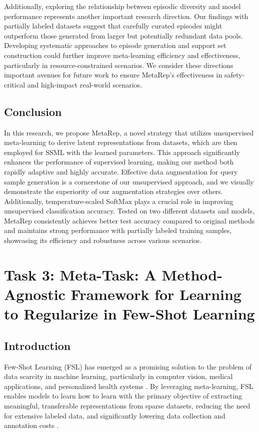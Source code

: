 Additionally, exploring the relationship between episodic diversity and model performance represents another important research direction. Our findings with partially labeled datasets suggest that carefully curated episodes might outperform those generated from larger but potentially redundant data pools. Developing systematic approaches to episode generation and support set construction could further improve meta-learning efficiency and effectiveness, particularly in resource-constrained scenarios. We consider these directions important avenues for future work to ensure MetaRep's effectiveness in safety-critical and high-impact real-world scenarios.

\subsection{Conclusion}

In this research, we propose MetaRep, a novel strategy that utilizes unsupervised meta-learning to derive latent representations from datasets, which are then employed for SSML with the learned parameters. This approach significantly enhances the performance of supervised learning, making our method both rapidly adaptive and highly accurate. Effective data augmentation for query sample generation is a cornerstone of our unsupervised approach, and we visually demonstrate the superiority of our augmentation strategies over others. Additionally, temperature-scaled SoftMax plays a crucial role in improving unsupervised classification accuracy. Tested on two different datasets and models, MetaRep consistently achieves better test accuracy compared to original methods and maintains strong performance with partially labeled training samples, showcasing its efficiency and robustness across various scenarios.

\section{Task 3: Meta-Task: A Method-Agnostic Framework for Learning to Regularize in Few-Shot Learning}

\subsection{Introduction}

Few-Shot Learning (FSL) has emerged as a promising solution to the problem of data scarcity in machine learning, particularly in computer vision, medical applications, and personalized health systems \cite{nayem2023few, PFM_Ali, Event_Ali}. By leveraging meta-learning, FSL enables models to learn how to learn with the primary objective of extracting meaningful, transferable representations from sparse datasets, reducing the need for extensive labeled data, and significantly lowering data collection and annotation costs \cite{metasgd,zhang2018metagan}.

